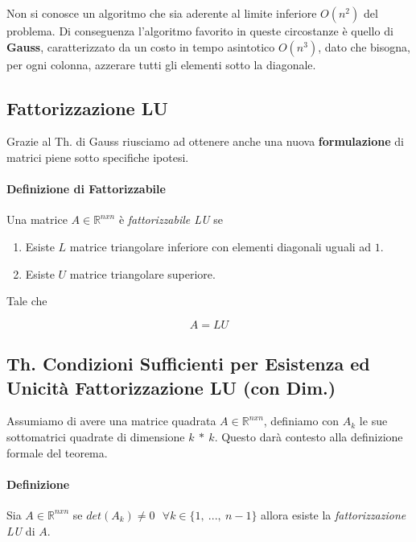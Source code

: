 \documentclass{article}
\begin{document}
\begin{enumerate}
    Non si conosce un algoritmo che sia aderente al limite inferiore $O(n^{2})$ del problema. Di conseguenza l'algoritmo favorito in queste circostanze è quello di \textbf{Gauss}, caratterizzato da un costo in tempo asintotico $O(n^{3})$, dato che bisogna, per ogni colonna, azzerare tutti gli elementi sotto la diagonale.
    
\end{enumerate}

\newpage

\subsection{Fattorizzazione LU}

Grazie al Th. di Gauss riusciamo ad ottenere anche una nuova \textbf{formulazione} di matrici piene sotto specifiche ipotesi.

\paragraph{Definizione di Fattorizzabile} Una matrice $A \in \mathbb{R}^{nxn}$ è \textit{fattorizzabile LU} se

\begin{enumerate}
    \item Esiste $L$ matrice triangolare inferiore con elementi diagonali uguali ad $1$.
    \item Esiste $U$ matrice triangolare superiore.
\end{enumerate}

Tale che

\vspace*{-8px}

\[ \boxed{A = LU} \]

\subsection{Th. Condizioni Sufficienti per Esistenza ed Unicità Fattorizzazione LU (con Dim.)}

Assumiamo di avere una matrice quadrata $A \in \mathbb{R}^{nxn}$, definiamo con $A_{k}$ le sue sottomatrici quadrate di dimensione $k \: * \: k$. Questo darà contesto alla definizione formale del teorema.

\paragraph{Definizione} Sia $A \in \mathbb{R}^{nxn}$ se $det(A_{k}) \neq 0 \: \: \: \forall k \in \{ 1,\:...,\:n-1 \}$ allora esiste la \textit{fattorizzazione LU} di $A$.
\end{document}

